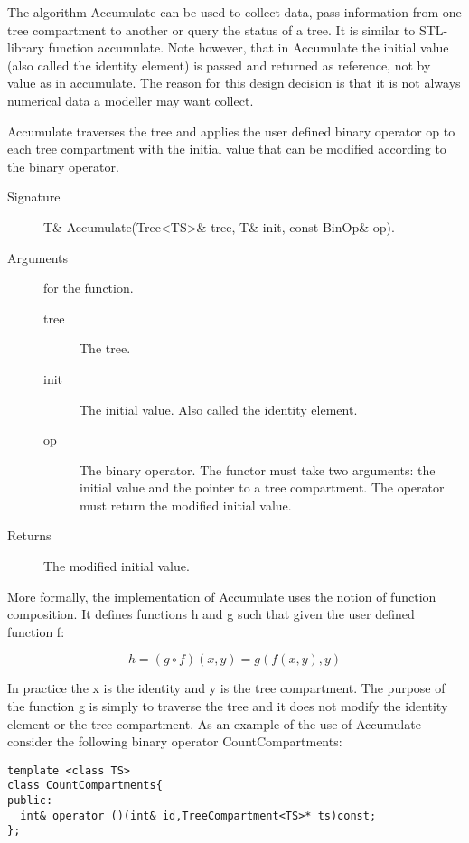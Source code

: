 The algorithm Accumulate can be used to collect data, pass information
from one tree compartment to another or query the status of a tree. It
is similar to STL-library  function accumulate.  Note however, that in
Accumulate  the initial value  (also called  the identity  element) is
passed and returned as reference,  not by value as in accumulate.  The
reason for  this design  decision is that  it is not  always numerical
data a modeller may want collect.

Accumulate traverses  the tree  and  applies the user  defined  binary
operator op to each  tree compartment with the  initial value that can
be modified according to the binary operator.

\begin{description}
   \item [Signature] T\& Accumulate(Tree<TS>\& tree, T\& init, const BinOp\& op).
   \item [Arguments] for the function.
     \begin{description}
        \item [tree] The tree.
        \item [init] The initial value. Also called the identity
     element.
        \item [op] The binary operator. The functor must take two
     arguments: the initial value and the pointer to a tree compartment. The
     operator must return the modified initial value.
     \end{description} 
   \item[Returns] The  modified initial value.
\end{description} 

More formally, the implementation of Accumulate uses the notion of
function composition. It defines functions h and g such that given the
user defined function f:

\begin{displaymath}
h = (g \circ f)(x,y) =  g(f(x,y),y)
\end{displaymath}

In practice the x is the  identity and y  is the tree compartment. The
purpose of the function g  is simply to  traverse the tree and it does
not modify the identity element or the tree compartment. As an example
of   the use  of  Accumulate  consider  the  following binary operator
CountCompartments:

\begin{verbatim}
template <class TS>
class CountCompartments{
public:
  int& operator ()(int& id,TreeCompartment<TS>* ts)const;
};
\end{verbatim}

